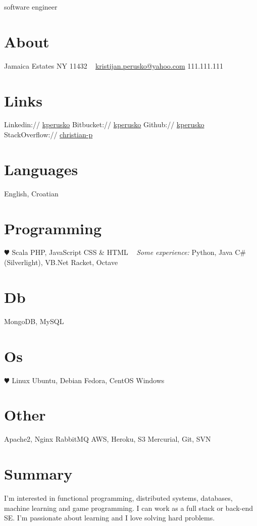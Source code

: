 \documentclass[print]{friggeri-cv}
\begin{document}
       {software engineer}


\begin{aside}
  \section{About}
    Jamaica Estates
    NY 11432
~
    \href{mailto:kristijan.perusko@yahoo.com}{kristijan.perusko@yahoo.com}
    111.111.111
  \section{Links}  
    Linkedin://  \href{https://www.linkedin.com/in/kperusko}{kperusko}
    Bitbucket:// \href{https://bitbucket.org/kperusko}{kperusko}    
    Github:// \href{https://github.com/kperuska}{kperusko}
    StackOverflow:// \href{http://stackoverflow.com/users/515053/christian-p}{christian-p}
  \section{Languages}
    English, Croatian
  \section{Programming}
    {\color{red} $\varheartsuit$} Scala
    PHP, JavaScript
    CSS \& HTML
~     
    \emph{Some experience:}
    Python, Java
    C\# (Silverlight), VB.Net
    Racket, Octave
  \section{Db}
    MongoDB, MySQL
  \section{Os}
    {\color{red} $\varheartsuit$} Linux 
    Ubuntu, Debian 
    Fedora, CentOS
    Windows
  \section{Other}
    Apache2, Nginx
    RabbitMQ
    AWS, Heroku, S3
    Mercurial, Git, SVN
\end{aside}

\section{Summary}

I'm interested in functional programming, distributed systems, databases, machine learning and game programming. I can work as a full stack or back-end SE. I'm passionate about learning and I love solving hard problems. 
\end{document}

